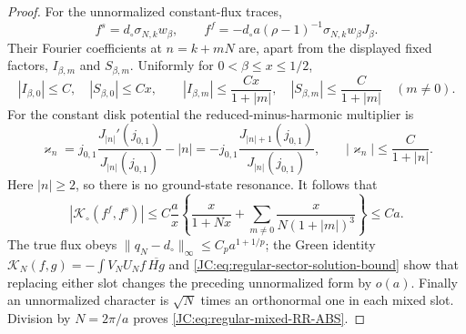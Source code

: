 \begin{proof}
For the unnormalized constant-flux traces,
\[
 f^s=d_\circ\sigma_{N,k}w_\beta,\qquad
 f^f=-d_\circ a(\rho-1)^{-1}\sigma_{N,k}w_\beta J_\beta.
\]
Their Fourier coefficients at $n=k+mN$ are, apart from the displayed
fixed factors, $I_{\beta,m}$ and $S_{\beta,m}$.  Uniformly for
$0<\beta\le x\le1/2$,
\[
 |I_{\beta,0}|\le C,\quad |S_{\beta,0}|\le Cx,\qquad
 |I_{\beta,m}|\le\frac{Cx}{1+|m|},\quad
 |S_{\beta,m}|\le\frac C{1+|m|}\quad(m\ne0).
\]
For the constant disk potential the reduced-minus-harmonic multiplier is
\[
 \varkappa_n=j_{0,1}\frac{J_{|n|}'(j_{0,1})}{J_{|n|}(j_{0,1})}-|n|
 =-j_{0,1}\frac{J_{|n|+1}(j_{0,1})}{J_{|n|}(j_{0,1})},
 \qquad |\varkappa_n|\le\frac C{1+|n|}.
\]
Here $|n|\ge2$, so there is no ground-state resonance.  It follows that
\[
 |\mathcal K_\circ(f^f,f^s)|
 \le C\frac ax\left\{\frac{x}{1+Nx}
 +\sum_{m\ne0}\frac{x}{N(1+|m|)^3}\right\}\le Ca.
\]
The true flux obeys
$\|q_N-d_\circ\|_\infty\le C_pa^{1+1/p}$; the Green identity
$\mathcal K_N(f,g)=-\int V_NU_Nf\,\overline{Hg}$ and
\eqref{JC:eq:regular-sector-solution-bound} show that replacing either slot
changes the preceding unnormalized form by $o(a)$.  Finally an
unnormalized character is $\sqrt N$ times an orthonormal one in each
mixed slot.  Division by $N=2\pi/a$ proves
\eqref{JC:eq:regular-mixed-RR-ABS}.


\end{proof}
